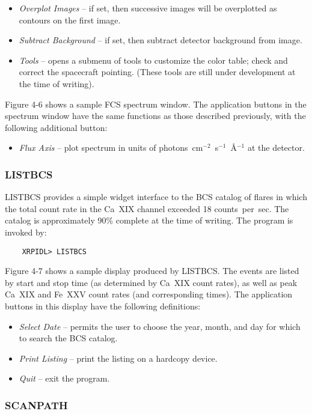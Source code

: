 {{{\begin{itemize}
\item{\it Overplot Images} -- if set, then successive images will
be overplotted as contours on the first image.

\item{\it Subtract Background} -- if set, then subtract detector background
from image.

\item{\it Tools} -- opens a submenu of tools to customize the color table;
check and correct the spacecraft pointing. (These tools are still under
development at the time of writing).
\end{itemize}

Figure 4-6 shows a sample FCS spectrum window. 
The application
buttons in the spectrum window have the same functions as those described 
previously, with the following additional button:

\begin{itemize}
\item{\it Flux Axis} -- plot spectrum in units of
photons~cm$^{-2}$~s$^{-1}$~\AA$^{-1}$ at the detector.
\end{itemize}
           
\subsubsection{LISTBCS}

LISTBCS provides a simple widget interface to the BCS catalog of flares in
which the total count rate in the Ca~XIX channel exceeded 18 counts~per~sec.
The catalog is approximately 90\% complete at the time of writing.
The program is invoked by:
\begin{verbatim}
    XRPIDL> LISTBCS
\end{verbatim}
Figure 4-7 shows a sample display produced by LISTBCS. The events are
listed by start and stop time (as determined by Ca~XIX count rates), as well as
peak Ca~XIX and Fe~XXV count rates (and corresponding times).
The application buttons in this display have the following definitions:
\begin{itemize}
\item{\it Select Date} -- permits the user to
choose the year, month, and day for which to search the BCS catalog.
\item{\it Print Listing} -- print the listing on a hardcopy device.
\item{\it Quit} -- exit the program.
\end{itemize}

\subsubsection{SCANPATH}

}}}
